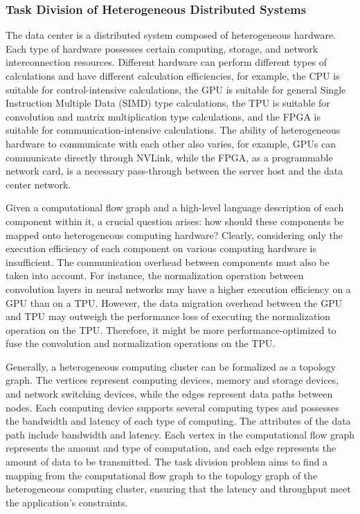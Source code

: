 \subsubsection{Task Division of Heterogeneous Distributed Systems}
\label{future:work-split}

The data center is a distributed system composed of heterogeneous hardware. Each type of hardware possesses certain computing, storage, and network interconnection resources. Different hardware can perform different types of calculations and have different calculation efficiencies, for example, the CPU is suitable for control-intensive calculations, the GPU is suitable for general Single Instruction Multiple Data (SIMD) type calculations, the TPU is suitable for convolution and matrix multiplication type calculations, and the FPGA is suitable for communication-intensive calculations. The ability of heterogeneous hardware to communicate with each other also varies, for example, GPUs can communicate directly through NVLink, while the FPGA, as a programmable network card, is a necessary pass-through between the server host and the data center network.

Given a computational flow graph and a high-level language description of each component within it, a crucial question arises: how should these components be mapped onto heterogeneous computing hardware? Clearly, considering only the execution efficiency of each component on various computing hardware is insufficient. The communication overhead between components must also be taken into account. For instance, the normalization operation between convolution layers in neural networks may have a higher execution efficiency on a GPU than on a TPU. However, the data migration overhead between the GPU and TPU may outweigh the performance loss of executing the normalization operation on the TPU. Therefore, it might be more performance-optimized to fuse the convolution and normalization operations on the TPU.

Generally, a heterogeneous computing cluster can be formalized as a topology graph. The vertices represent computing devices, memory and storage devices, and network switching devices, while the edges represent data paths between nodes. Each computing device supports several computing types and possesses the bandwidth and latency of each type of computing. The attributes of the data path include bandwidth and latency. Each vertex in the computational flow graph represents the amount and type of computation, and each edge represents the amount of data to be transmitted. The task division problem aims to find a mapping from the computational flow graph to the topology graph of the heterogeneous computing cluster, ensuring that the latency and throughput meet the application's constraints.

